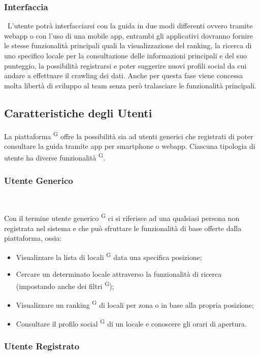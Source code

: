 \subsubsection{Interfaccia} \ 
L’utente potrà interfacciarsi con la guida in due modi differenti ovvero tramite webapp o con l’uso di una mobile app, entrambi gli applicativi dovranno fornire le stesse funzionalità principali quali la visualizzazione del ranking, la ricerca di uno specifico locale per la consultazione delle informazioni principali e del suo punteggio, la possibilità registrarsi e poter suggerire nuovi profili social da cui andare a effettuare il crawling dei dati.
Anche per questa fase viene concessa molta libertà di sviluppo al team senza però tralasciare le funzionalità principali.

\subsection{Caratteristiche degli Utenti}

La piattaforma \textsuperscript{G} offre la possibilità sia ad utenti generici che registrati di poter consultare la guida tramite app per smartphone o webapp. Ciascuna tipologia di utente ha diverse funzionalità \textsuperscript{G}.

\subsubsection{Utente Generico} \ 

Con il termine utente generico \textsuperscript{G} ci si riferisce ad una qualsiasi persona non registrata nel sistema e che può sfruttare le funzionalità di base offerte dalla piattaforma, ossia:

\begin{itemize}
  \item Visualizzare la lista di locali \textsuperscript{G} data una specifica posizione;
  \item Cercare un determinato locale attraverso la funzionalità di ricerca (impostando anche dei filtri \textsuperscript{G});
  \item Visualizzare un ranking \textsuperscript{G} di locali per zona o in base alla propria posizione;
  \item Consultare il profilo social \textsuperscript{G} di un locale e conoscere gli orari di apertura.
\end{itemize}

\subsubsection{Utente Registrato} \ 

